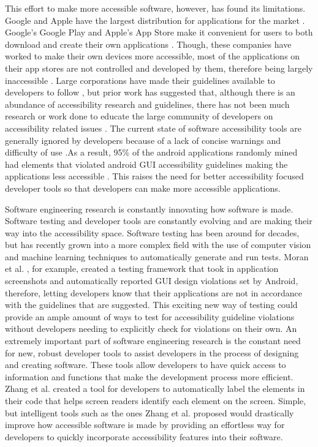 This effort to make more accessible software, however, has found its limitations. Google and Apple have the largest distribution for applications for the market \cite{17}. Google's Google Play and Apple’s App Store make it convenient for users to both download and create their own applications \cite{17}. Though, these companies have worked to make their own devices more accessible, most of the applications on their app stores are not controlled and developed by them, therefore being largely inaccessible \cite{16}. Large corporations have made their guidelines available to developers to follow \cite{25,26}, but prior work has suggested that, although there is an abundance of accessibility research and guidelines, there has not been much research or work done to educate the large community of developers on accessibility related issues \cite{16, 15}. The current state of software accessibility tools are generally ignored by developers because of a lack of concise warnings and difficulty of use \cite{9,16}.As a result, 95\% of the android applications randomly mined had elements that violated android GUI accessibility guidelines making the applications less accessible \cite{15}. This raises the need for better accessibility focused developer tools so that developers can make more accessible applications. 

Software engineering research is constantly innovating how software is made. Software testing and developer tools are constantly evolving and are making their way into the accessibility space. Software testing has been around for decades, but has recently grown into a more complex field with the use of computer vision and machine learning techniques to automatically generate and run tests. Moran et al. \cite{42}, for example, created a testing framework that took in application screenshots and automatically reported GUI design violations set by Android, therefore, letting developers know that their applications are not in accordance with the guidelines that are suggested. This exciting new way of testing could provide an ample amount of ways to test for accessibility guideline violations without developers needing to explicitly check for violations on their own. An extremely important part of software engineering research is the constant need for new, robust developer tools to assist developers in the process of designing and creating software. These tools allow developers to have quick access to information and functions that make the development process more efficient. Zhang et al. \cite{15} created a tool for developers to automatically label the elements in their code that helps screen readers identify each element on the screen. Simple, but intelligent tools such as the ones Zhang et al. \cite{15} proposed would drastically improve how accessible software is made by providing an effortless way for developers to quickly incorporate accessibility features into their software. 

